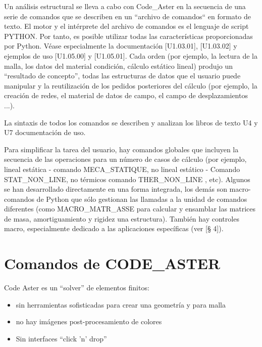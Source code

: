 \documentclass[12pt]{book}
\theoremstyle{definition}
\theoremstyle{remark}
\theoremstyle{plain}
\begin{document}
Un análisis estructural se lleva a cabo con Code\_Aster en la secuencia de una 
serie de comandos que se describen en un ``archivo de comandos`` en formato de 
texto. El motor y el intérprete del archivo de comandos es el lenguaje de script
 PYTHON. Por tanto, es posible utilizar todas las características proporcionadas 
por Python. Véase especialmente la documentación [U1.03.01], [U1.03.02] y ejemplos
 de uso [U1.05.00] y [U1.05.01]. Cada orden (por ejemplo, la lectura de la malla, 
los datos del material condición, cálculo estático lineal) produjo un ``resultado 
de concepto'', todas las estructuras de datos que el usuario puede manipular y la 
reutilización de los pedidos posteriores del cálculo (por ejemplo, la creación 
de redes, el material de datos de campo, el campo de desplazamientos ...).

La sintaxis de todos los comandos se describen y analizan los libros de texto U4 y 
U7 documentación de uso.

Para simplificar la tarea del usuario, hay comandos globales que incluyen la
secuencia de las operaciones para un número de casos de cálculo (por ejemplo, 
lineal estática - comando MECA\_STATIQUE, no lineal estático - Comando 
STAT\_NON\_LINE,
no térmicos comando THER\_NON\_LINE , etc). Algunos se han desarrollado directamente 
en una forma integrada, los demás son macro-comandos de Python que sólo gestionan
las llamadas a la unidad de comandos diferentes (como MACRO\_MATR\_ASSE para calcular
 y ensamblar las matrices de masa, amortiguamiento y rigidez una estructura).
También hay controles macro, especialmente dedicado a las aplicaciones específicas 
(ver [§ 4]).



\chapter{Comandos de CODE\_ASTER}

Code Aster es un ``solver'' de elementos finitos:
\begin{itemize}
 \item sin herramientas sofisticadas para crear una geometría y para malla
 \item no hay imágenes post-procesamiento de colores
 \item Sin interfaces “click 'n' drop”
\end{itemize}
\end{document}
